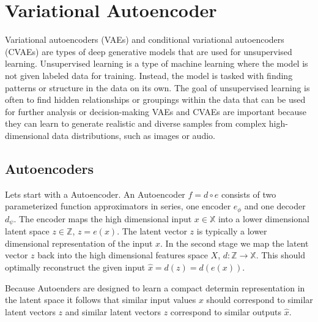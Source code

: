 \section{Variational Autoencoder}

Variational autoencoders (VAEs) and conditional variational autoencoders (CVAEs) are types of deep generative models that are used for unsupervised learning. Unsupervised learning is a type of machine learning where the model is not given labeled data for training. Instead, the model is tasked with finding patterns or structure in the data on its own. The goal of unsupervised learning is often to find hidden relationships or groupings within the data that can be used for further analysis or decision-making
VAEs and CVAEs are important because they can learn to generate realistic and diverse samples from complex high-dimensional data distributions, such as images or audio.

\subsection{Autoencoders}


Lets start with a Autoencoder. An Autoencoder $f = d \circ e$ consists of two parameterized function approximators in series, one encoder $e_\phi$ and one decoder $d_\psi$. 
The encoder maps the high dimensional input $x \in \mathbb{X}$ into a lower dimensional latent space $z \in \mathbb{Z}$, $z = e(x)$.
The latent vector $z$ is typically a lower dimensional representation of the input $x$. 
In the second stage we map the latent vector $z$ back into the high dimensional features space $X$, $d: \mathbb{Z} \to \mathbb{X}$. This should optimally reconstruct the given input $\hat{x} = d(z) = d(e(x))$. 

Because Autoenders are designed to learn a compact determin representation in the latent space it follows that similar input values $x$ should correspond to similar latent vectors $z$ and similar latent vectors $z$ correspond to similar outputs $\hat{x}$.

